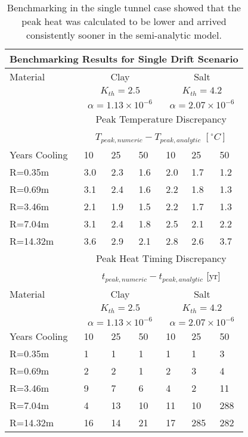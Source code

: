 \begin{table}
  \centering
  \begin{tabular}{|l|l|l|l|l|l|l|}
    \multicolumn{7}{c}{\textbf{Benchmarking Results for Single Drift 
    Scenario}}\\
    \hline
    Material & \multicolumn{3}{|c|}{Clay} & \multicolumn{3}{|c|}{Salt}\\ & 
    \multicolumn{3}{|c|}{$K_{th}=2.5$} & \multicolumn{3}{|c|}{$K_{th}=4.2$}\\ & 
    \multicolumn{3}{|c|}{$\alpha=1.13\times10^{-6}$} & 
    \multicolumn{3}{|c|}{$\alpha=2.07\times10^{-6}$}\\ 
    \hline
    & \multicolumn{6}{|c|}{Peak Temperature Discrepancy}\\ 
    & \multicolumn{6}{|c|}{$T_{peak,numeric}-T_{peak,analytic}$ $[^{\circ}C]$} \\
    \hline
    Years Cooling  & 10     & 25      & 50      & 10     & 25     & 50\\
    \hline
     R=0.35m  & 3.0   & 2.3     & 1.6    & 2.0   & 1.7   & 1.2\\
     R=0.69m  & 3.1   & 2.4    & 1.6    & 2.2    & 1.8   & 1.3\\
     R=3.46m  & 2.1   & 1.9    & 1.5    & 2.2   & 1.7    & 1.3\\
     R=7.04m  & 3.1   & 2.4     & 1.8    & 2.5   & 2.1   & 2.2\\
     R=14.32m & 3.6   & 2.9    & 2.1    & 2.8   & 2.6   & 3.7\\
    \hline
    & \multicolumn{6}{|c|}{Peak Heat Timing Discrepancy}\\ 
    & \multicolumn{6}{|c|}{ $t_{peak,numeric}-t_{peak,analytic}$ [yr]} \\
    \hline
    Material & \multicolumn{3}{|c|}{Clay} & \multicolumn{3}{|c|}{Salt}\\ & 
    \multicolumn{3}{|c|}{$K_{th}=2.5$} & \multicolumn{3}{|c|}{$K_{th}=4.2$}\\ & 
    \multicolumn{3}{|c|}{$\alpha=1.13\times10^{-6}$} & 
    \multicolumn{3}{|c|}{$\alpha=2.07\times10^{-6}$}\\ \hline
    Years Cooling  & 10     & 25      & 50      & 10     & 25     & 50\\
    \hline
     R=0.35m  & 1    & 1       & 1   & 1      & 1      & 3\\
     R=0.69m  & 2    & 2       & 1    & 2      & 3      & 4\\
     R=3.46m  & 9    & 7       & 6    & 4      & 2      & 11\\
     R=7.04m  & 4    & 13      & 10    & 11     & 10     & 288\\
     R=14.32m & 16   & 14      & 21   & 17     & 285    & 282\\
    \hline
  \end{tabular}
  \caption{Benchmarking in the single tunnel case showed that the peak heat was 
  calculated to be lower and arrived consistently sooner in the semi-analytic model. 
  }
  \label{tab:benchSingle}
\end{table}

